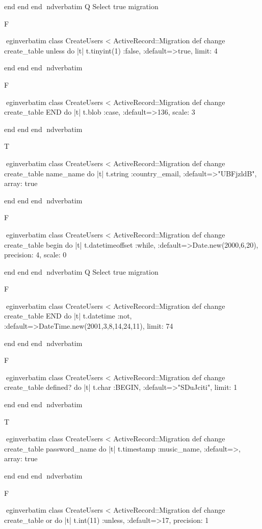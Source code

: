     end 
  end 
end
nd{verbatim}
Q
 Select true migration

F

egin{verbatim}
 class CreateUsers < ActiveRecord::Migration 
  def change 
    create_table unless do |t| 
      t.tinyint(1) :false, :default=>true, limit: 4
    
    end 
  end 
end
nd{verbatim}

F

egin{verbatim}
 class CreateUsers < ActiveRecord::Migration 
  def change 
    create_table END do |t| 
      t.blob :case, :default=>136, scale: 3
    
    end 
  end 
end
nd{verbatim}

T

egin{verbatim}
 class CreateUsers < ActiveRecord::Migration 
  def change 
    create_table name_name do |t| 
      t.string :country_email, :default=>"UBFjzldB", array: true
    
    end 
  end 
end
nd{verbatim}

F

egin{verbatim}
 class CreateUsers < ActiveRecord::Migration 
  def change 
    create_table begin do |t| 
      t.datetimeoffset :while, :default=>Date.new(2000,6,20), precision: 4, scale: 0
    
    end 
  end 
end
nd{verbatim}
Q
 Select true migration

F

egin{verbatim}
 class CreateUsers < ActiveRecord::Migration 
  def change 
    create_table END do |t| 
      t.datetime :not, :default=>DateTime.new(2001,3,8,14,24,11), limit: 74
    
    end 
  end 
end
nd{verbatim}

F

egin{verbatim}
 class CreateUsers < ActiveRecord::Migration 
  def change 
    create_table defined? do |t| 
      t.char :BEGIN, :default=>"SDuJciti", limit: 1
    
    end 
  end 
end
nd{verbatim}

T

egin{verbatim}
 class CreateUsers < ActiveRecord::Migration 
  def change 
    create_table password_name do |t| 
      t.timestamp :music_name, :default=>, array: true
    
    end 
  end 
end
nd{verbatim}

F

egin{verbatim}
 class CreateUsers < ActiveRecord::Migration 
  def change 
    create_table or do |t| 
      t.int(11) :unless, :default=>17, precision: 1
    
